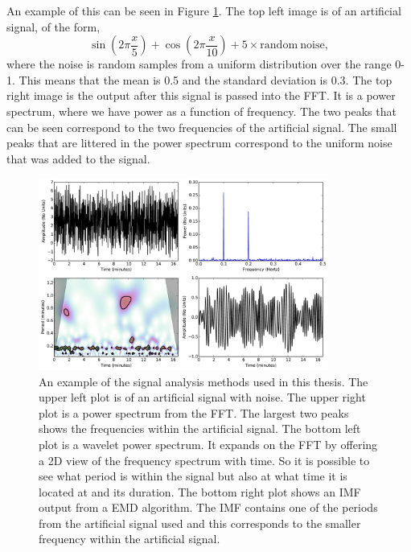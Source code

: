     An example of this can be seen in Figure \ref{fig:signal_overview}.
    The top left image is of an artificial signal, of the form, $$\sin\left(2\pi \frac{x}{5}\right) + \cos\left(2\pi \frac{x}{10}\right) + 5\times\mathrm{random\ noise},$$ where the noise is random samples from a uniform distribution over the range 0-1.
    This means that the mean is 0.5 and the standard deviation is $0.3$.
    The top right image is the output after this signal is passed into the FFT.
    It is a power spectrum, where we have power as a function of frequency.
    The two peaks that can be seen correspond to the two frequencies of the artificial signal.
    The small peaks that are littered in the power spectrum correspond to the uniform noise that was added to the signal.
    
   	\begin{figure}
           \centering
           \includegraphics[width=0.85\textwidth]{signal_overview.pdf}
           \caption{
                   An example of the signal analysis methods used in this thesis. 
                   The upper left plot is of an artificial signal with noise.
                   The upper right plot is a power spectrum from the FFT.
                   The largest two peaks shows the frequencies within the artificial signal.
                   The bottom left plot is a wavelet power spectrum.
                   It expands on the FFT by offering a 2D view of the frequency spectrum with time.
                   So it is possible to see what period is within the signal but also at what time it is located at and its duration.
                   The bottom right plot shows an IMF output from a EMD algorithm.
                   The IMF contains one of the periods from the artificial signal used and this corresponds to the smaller frequency within the artificial signal.
                   }
              \label{fig:signal_overview}
     \end{figure}
	
